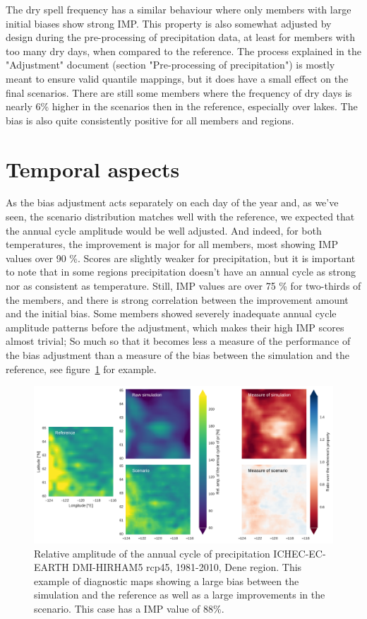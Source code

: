 \documentclass[letterpaper,10pt]{article}
\begin{document}
The dry spell frequency has a similar behaviour where only members with large initial biases show strong IMP.
This property is also somewhat adjusted by design during the pre-processing of precipitation data, at least for members with too many dry days, when compared to the reference.
The process explained in the "Adjustment" document (section "Pre-processing of precipitation") is mostly meant to ensure valid quantile mappings, but it does have a small effect on the final scenarios.
There are still some members where the frequency of dry days is nearly 6\% higher in the scenarios then in the reference, especially over lakes.
The bias is also quite consistently positive for all members and regions.

\section{Temporal aspects}
As the bias adjustment acts separately on each day of the year and, as we've seen, the scenario distribution matches well with the reference, we expected that the annual cycle amplitude would be well adjusted.
And indeed, for both temperatures, the improvement is major for all members, most showing IMP values over 90 \%.
Scores are slightly weaker for precipitation, but it is important to note that in some regions precipitation doesn't have an annual cycle as strong nor as consistent as temperature.
Still, IMP values are over 75 \% for two-thirds of the members, and there is strong correlation between the improvement amount and the initial bias.
Some members showed severely inadequate annual cycle amplitude patterns before the adjustment, which makes their high IMP scores almost trivial;
So much so that it becomes less a measure of the performance of the bias adjustment than a measure of the bias between the simulation and the reference, see figure~\ref{fig:acapr} for example.

\begin{figure}
\includegraphics[width=\textwidth]{../images/aca_pr_diags.pdf}
\caption{Relative amplitude of the annual cycle of precipitation ICHEC-EC-EARTH DMI-HIRHAM5 rcp45, 1981-2010, Dene region. This example of diagnostic maps showing a large bias between the simulation and the reference as well as a large improvements in the scenario. This case has a IMP value of 88\%.}\label{fig:acapr}
\end{figure}
\end{document}
